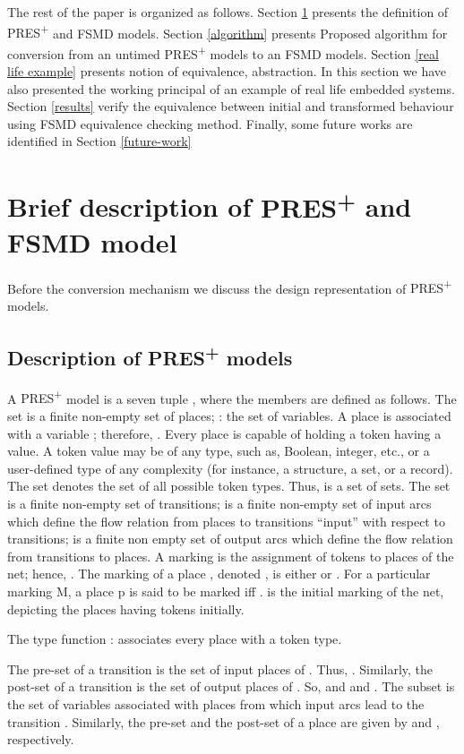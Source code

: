 \documentclass[9pt,executive]{article}
\def\presp{PRES\textsuperscript{+}}
\def\fsmd{FSMD}
\def\presp{PRES\textsuperscript{+}}
\def\fsmd{FSMD}
\begin{document}
  The rest of the paper is organized as follows. 
 Section \ref{description} presents the definition of {\presp} and {\fsmd} models.
 Section \ref{algorithm} presents Proposed algorithm for conversion from an untimed {\presp} models to an {\fsmd} models. 
 Section \ref{real life example}  presents notion of equivalence, abstraction. In this section we have also presented the
 working principal of an example of real life embedded systems.  
 Section \ref{results} verify the equivalence between initial and transformed behaviour using {\fsmd} equivalence checking method. 
 Finally, some future works are identified in Section \ref{future-work}
\section{Brief description of {\presp} and {\fsmd} model}\label{description}
Before the conversion mechanism we discuss the design representation of {\presp} models.
\subsection{ Description of {\presp} models}
  A {\presp} model is a seven tuple ,
where the members are defined as follows. The set 
is a finite non-empty set of places; : the set of variables. A place  is associated with a variable ; 
therefore, . Every place is capable of holding a token having a value. 
A token value may be of any type, such as, Boolean, integer, etc., or a user-defined type of any 
complexity (for instance, a structure, a set, or a record). The set  denotes the set of all possible token types. 
Thus,  is a set of sets. The set   is a finite non-empty set of transitions; 
 is a finite non-empty set of input arcs which define the flow relation from places to 
transitions  ``input'' with respect to transitions;  is a finite non empty set of output arcs 
which define the flow relation from transitions to places. A marking   is the assignment of tokens to places of the net; 
hence, . The marking of a place , denoted , is either   or . For a particular marking M, 
a place p is said to be marked iff .  is the initial marking of the net, depicting the places having tokens initially. 
  
  The type function :  associates every place 
with a token type. 

  The pre-set   of a transition  is the set of input  places of .
Thus, . Similarly, the post-set  
of a transition  is the set of output  places of . So,  and  and . The subset  is the set of variables associated with places from which input
arcs lead to the transition . Similarly, the pre-set   and the post-set    of a place  are given by  and , respectively. 
\end{document}
